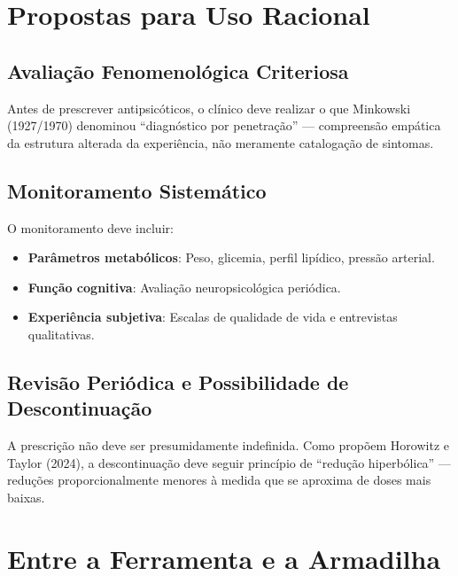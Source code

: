 \section{Propostas para Uso Racional}
\label{sec:uso-racional}

\subsection{Avaliação Fenomenológica Criteriosa}

Antes de prescrever antipsicóticos, o clínico deve realizar o que Minkowski (1927/1970) denominou \enquote{diagnóstico por penetração} --- compreensão empática da estrutura alterada da experiência, não meramente catalogação de sintomas.

\subsection{Monitoramento Sistemático}

O monitoramento deve incluir:

\begin{itemize}
\item \textbf{Parâmetros metabólicos}: Peso, glicemia, perfil lipídico, pressão arterial.
\item \textbf{Função cognitiva}: Avaliação neuropsicológica periódica.
\item \textbf{Experiência subjetiva}: Escalas de qualidade de vida e entrevistas qualitativas.
\end{itemize}

\subsection{Revisão Periódica e Possibilidade de Descontinuação}

A prescrição não deve ser presumidamente indefinida. Como propõem Horowitz e Taylor (2024), a descontinuação deve seguir princípio de \enquote{redução hiperbólica} --- reduções proporcionalmente menores à medida que se aproxima de doses mais baixas.

\section{Entre a Ferramenta e a Armadilha}
\label{sec:ferramenta-armadilha}

